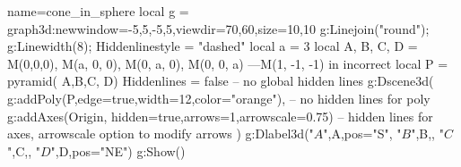 \documentclass[12pt]{standalone}
\begin{document}
\begin{luadraw}{name=cone_in_sphere}
local g = graph3d:new{window={-5,5,-5,5},viewdir={70,60},size={10,10}}
g:Linejoin("round"); g:Linewidth(8); Hiddenlinestyle = "dashed"
local a = 3
local A, B, C, D = M(0,0,0),   M(a, 0, 0),   M(0, a, 0),   M(0, 0, a) ---M(1, -1, -1) in incorrect
local P = pyramid( {A,B,C}, D)
Hiddenlines = false -- no global hidden lines
g:Dscene3d(
g:addPoly(P,{edge=true,width=12,color="orange"}), -- no hidden lines for poly
g:addAxes(Origin, {hidden=true,arrows=1,arrowscale=0.75}) -- hidden lines for axes, arrowscale option to modify arrows
)
g:Dlabel3d("$A$",A,{pos="S"}, "$B$",B,{}, "$C$",C,{}, "$D$",D,{pos="NE"})
g:Show()
\end{luadraw}
\end{document}

